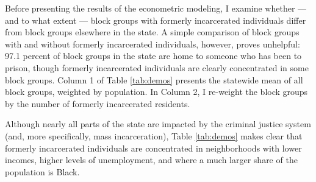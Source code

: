 \documentclass[
  12pt,
]{article}
\begin{document}
Before presenting the results of the econometric modeling, I examine whether --- and to what extent --- block groups with formerly incarcerated individuals differ from block groups elsewhere in the state. A simple comparison of block groups with and without formerly incarcerated individuals, however, proves unhelpful: 97.1 percent of block groups in the state are home to someone who has been to prison, though formerly incarcerated individuals are clearly concentrated in some block groups. Column 1 of Table \ref{tab:demos} presents the statewide mean of all block groups, weighted by population. In Column 2, I re-weight the block groups by the number of formerly incarcerated residents.



Although nearly all parts of the state are impacted by the criminal justice system (and, more specifically, mass incarceration), Table \ref{tab:demos} makes clear that formerly incarcerated individuals are concentrated in neighborhoods with lower incomes, higher levels of unemployment, and where a much larger share of the population is Black.
\end{document}
